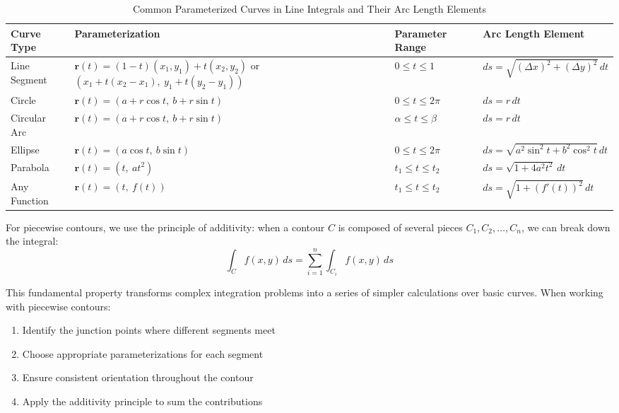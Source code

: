 \begin{table}[htb]
\caption{Common Parameterized Curves in Line Integrals and Their Arc Length Elements}
\begin{center}
\small
\begin{tabular}{|p{2.5cm}|p{4.5cm}|p{3cm}|p{4cm}|}
\hline
\rule{0pt}{4ex}\textbf{Curve Type} & \textbf{Parameterization} & \textbf{Parameter Range} & \textbf{Arc Length Element} \rule[-2ex]{0pt}{0pt}\\
\hline
\rule{0pt}{5ex}Line Segment &
$\mathbf{r}(t) = (1-t)(x_1,y_1) + t(x_2,y_2)$ \newline
or \newline
$(x_1 + t(x_2-x_1),\ y_1 + t(y_2-y_1))$ &
$0 \leq t \leq 1$ &
$ds = \sqrt{(\Delta x)^2 + (\Delta y)^2}\,dt$ \rule[-2.5ex]{0pt}{0pt}\\
\hline
\rule{0pt}{4ex}Circle &
$\mathbf{r}(t) = (a + r\cos t,\ b + r\sin t)$ &
$0 \leq t \leq 2\pi$ &
$ds = r\,dt$ \rule[-2ex]{0pt}{0pt}\\
\hline
\rule{0pt}{4ex}Circular Arc &
$\mathbf{r}(t) = (a + r\cos t,\ b + r\sin t)$ &
$\alpha \leq t \leq \beta$ &
$ds = r\,dt$ \rule[-2ex]{0pt}{0pt}\\
\hline
\rule{0pt}{4ex}Ellipse &
$\mathbf{r}(t) = (a\cos t,\ b\sin t)$ &
$0 \leq t \leq 2\pi$ &
$ds = \sqrt{a^2\sin^2 t + b^2\cos^2 t}\,dt$ \rule[-2ex]{0pt}{0pt}\\
\hline
\rule{0pt}{4ex}Parabola &
$\mathbf{r}(t) = (t,\ at^2)$ &
$t_1 \leq t \leq t_2$ &
$ds = \sqrt{1 + 4a^2 t^2}\,dt$ \rule[-2ex]{0pt}{0pt}\\
\hline
\rule{0pt}{4ex}Any Function &
$\mathbf{r}(t) = (t,\ f(t))$ &
$t_1 \leq t \leq t_2$ &
$ds = \sqrt{1 + \left(f'(t)\right)^2}\,dt$ \rule[-2ex]{0pt}{0pt}\\
\hline
\end{tabular}
\end{center}
\label{tab:curve-parameterizations}
\end{table}

\noindent For piecewise contours, we use the principle of additivity: when a contour $C$ is composed of several pieces $C_1, C_2, \ldots, C_n$, we can break down the integral:
\[
\int_C f(x,y)\,ds = \sum_{i=1}^n \int_{C_i} f(x,y)\,ds
\]

\noindent This fundamental property transforms complex integration problems into a series of simpler calculations over basic curves. When working with piecewise contours:

\begin{enumerate}
    \item Identify the junction points where different segments meet
    \item Choose appropriate parameterizations for each segment
    \item Ensure consistent orientation throughout the contour
    \item Apply the additivity principle to sum the contributions
\end{enumerate}

